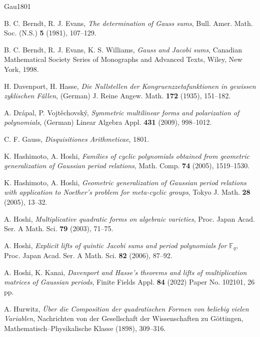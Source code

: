 \documentclass[a4paper, 11pt]{amsart}
\newcommand{\F}{\mathbb F}
\theoremstyle{plain}
\theoremstyle{definition}
\numberwithin{equation}{section}
\begin{document}
\begin{thebibliography}{Gau1801}

B. C. Berndt, R. J. Evans, 
{\it The determination of Gauss sums}, 
Bull. Amer. Math. Soc. (N.S.) \textbf{5} (1981), 107--129.

B. C. Berndt, R. J. Evans, K. S. Williams,
\textit{Gauss and Jacobi sums},
Canadian Mathematical Society Series of Monographs and Advanced Texts, 
Wiley, New York, 1998.

H. Davenport, H. Hasse,
{\it Die Nullstellen der Kongruenzzetafunktionen in gewissen 
zyklischen F\"{a}llen}, (German) 
J. Reine Angew. Math. \textbf{172} (1935), 151--182. 

A. Dr\'apal, P. Vojt\v{e}chovsk\'y,
{\it Symmetric multilinear forms and polarization of polynomials}, (German) 
Linear Algebra Appl. \textbf{431} (2009), 998--1012. 

C. F. Gauss, 
\textit{Disquisitiones Arithmeticae}, 1801.

K. Hashimoto, A. Hoshi, 
{\it Families of cyclic polynomials obtained from geometric generalization 
of Gaussian period relations}, 
Math. Comp. \textbf{74} (2005), 1519--1530.

K. Hashimoto, A. Hoshi, 
{\it Geometric generalization of Gaussian period relations with application 
to Noether's problem for meta-cyclic groups}, 
Tokyo J. Math. \textbf{28} (2005), 13--32.

A. Hoshi, 
{\it Multiplicative quadratic forms on algebraic varieties}, 
Proc. Japan Acad. Ser. A Math. Sci. \textbf{79} (2003), 71--75.

A. Hoshi, 
{\it Explicit lifts of quintic Jacobi sums and period polynomials 
for $\F_q$}, 
Proc. Japan Acad. Ser. A Math. Sci. \textbf{82} (2006), 87--92.

A. Hoshi, K. Kanai, 
{\it Davenport and Hasse's theorems and lifts of multiplication 
matrices of Gaussian periods}, 
Finite Fields Appl. \textbf{84} (2022) Paper No. 102101, 26 pp.

A. Hurwitz, 
{\it \"Uber die Composition der quadratischen Formen von beliebig vielen 
Variablen}, 
Nachrichten von der Gesellschaft der Wissenschaften zu G\"ottingen, 
Mathematisch--Physikalische Klasse (1898), 309--316.


\end{thebibliography}
\end{document}
